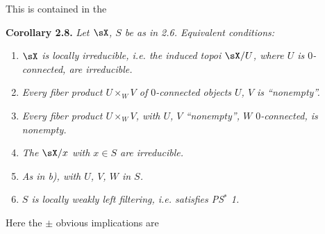 
\noindent This is contained in the

\noindent\textbf{Corollary 2.8.} \textit{Let $\sX$, $S$ be as in 2.6. Equivalent conditions:}
\begin{enumerate}[label={},leftmargin=3em]
\item[\textit{a)}] \textit{$\sX$ is locally irreducible, i.e. the induced topoi $\sX/U$, where $U$ is $0$-connected, are irreducible.}
\item[\textit{b)}] \textit{Every fiber product $U \times_W V$ of $0$-connected objects $U$, $V$ is ``nonempty''.}
\item[\textit{b$'$)}] \textit{Every fiber product $U \times_W V$, with $U$, $V$ ``nonempty'', $W$ $0$-connected, is nonempty.}
\item[\textit{c)}] \textit{The $\sX/x$ with $x \in S$ are irreducible.}
\item[\textit{d)}] \textit{As in b), with $U$, $V$, $W$ in $S$.}
\item[\textit{e)}] \textit{$S$ is locally weakly left filtering, i.e. satisfies PS$^*$ 1.}
\end{enumerate}
\noindent Here the $\pm$ obvious implications are